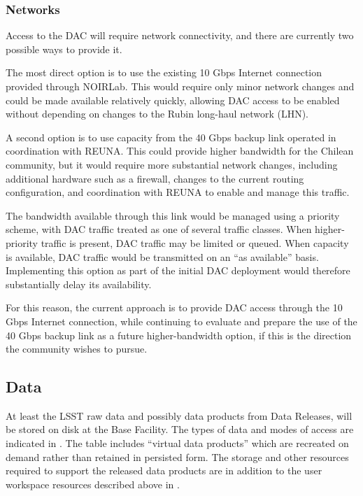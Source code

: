 


\subsubsection{Networks}

Access to the DAC will require network connectivity, and there are currently two possible ways to provide it.

The most direct option is to use the existing 10 Gbps Internet connection provided through NOIRLab. This would require only minor network changes and could be made available relatively quickly, allowing DAC access to be enabled without depending on changes to the Rubin long-haul network (LHN).

A second option is to use capacity from the 40 Gbps backup link operated in coordination with REUNA. This could provide higher bandwidth for the Chilean community, but it would require more substantial network changes, including additional hardware such as a firewall, changes to the current routing configuration, and coordination with REUNA to enable and manage this traffic.

The bandwidth available through this link would be managed using a priority scheme, with DAC traffic treated as one of several traffic classes. When higher-priority traffic is present, DAC traffic may be limited or queued. When capacity is available, DAC traffic would be transmitted on an “as available” basis. Implementing this option as part of the initial DAC deployment would therefore substantially delay its availability.

For this reason, the current approach is to provide DAC access through the 10 Gbps Internet connection, while continuing to evaluate and prepare the use of the 40 Gbps backup link as a future higher-bandwidth option, if this is the direction the community wishes to pursue.

\subsection{Data}
\label{sec:data}

At least the LSST raw data and possibly data products from Data Releases, will be stored on disk at the Base Facility.
The types of data and modes of access are indicated in .
The table includes ``virtual data products'' which are recreated on demand rather than retained in persisted form.
The storage and other resources required to support the released data products are in addition to the user workspace resources described above in .

